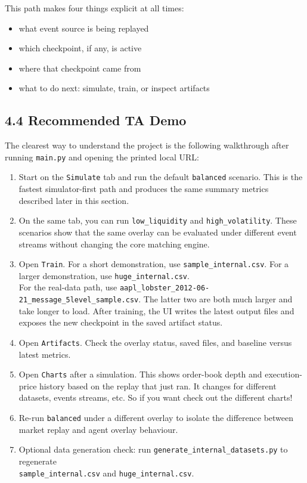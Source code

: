 \documentclass[11pt]{article}
\begin{document}
This path makes four things explicit at all times:
\begin{itemize}
    \item what event source is being replayed
    \item which checkpoint, if any, is active
    \item where that checkpoint came from
    \item what to do next: simulate, train, or inspect artifacts
\end{itemize}

\subsection*{4.4 Recommended TA Demo}
The clearest way to understand the project is the following walkthrough after
running \texttt{main.py} and opening the printed local URL:
\begin{enumerate}
    \item Start on the \texttt{Simulate} tab and run the default
    \texttt{balanced} scenario. This is the fastest simulator-first path and
    produces the same summary metrics described later in this section.
    \item On the same tab, you can run \texttt{low\_liquidity} and
    \texttt{high\_volatility}. These scenarios show that the same overlay can
    be evaluated under different event streams without changing the core
    matching engine.
    \item Open \texttt{Train}. For a short demonstration, use
    \texttt{sample\_internal.csv}. For a larger demonstration, use
    \texttt{huge\_internal.csv}. \\
    For the real-data path, use
    \texttt{aapl\_lobster\_2012-06-21\_message\_5level\_sample.csv}. The
    latter two are both much larger and take longer to load. After training,
    the UI writes the latest output files and exposes the new checkpoint in the
    saved artifact status.
    \item Open \texttt{Artifacts}. Check the overlay status, saved files, and
    baseline versus latest metrics.
    \item Open \texttt{Charts} after a simulation. This shows order-book depth
    and execution-price history based on the replay that just ran. It changes for different datasets, events streams, etc. So if you want check out the different charts!
    \item Re-run \texttt{balanced} under a different overlay to isolate the
    difference between market replay and agent overlay behaviour.
    \item Optional data generation check: run
    \texttt{generate\_internal\_datasets.py} to regenerate \\
    \texttt{sample\_internal.csv} and \texttt{huge\_internal.csv}.
\end{enumerate}
\end{document}
